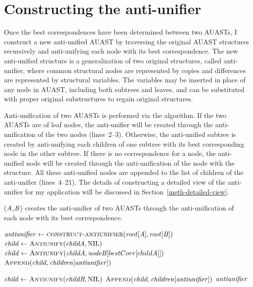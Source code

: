 \section{Constructing the anti-unifier} \label{meth-antiUnifier}
Once the best correspondences have been determined between two AUASTs, I construct a new anti-unified AUAST by traversing the original AUAST structures recursively and anti-unifying each node with its best correspondence. The new anti-unified structure is a generalization of two original structures, called anti-unifier, where common structural nodes are represented by copies and differences are represented by structural variables. The variables may be inserted in place of any node in AUAST, including both subtrees and leaves, and can be substituted with proper original substructures to regain original structures.



Anti-unification of two AUASTs is performed via the  algorithm. If the two AUASTs are of leaf nodes, the anti-unifier will be created through the anti-unification of the two nodes (lines~2--3). Otherwise, the anti-unified subtree is created by anti-unifying each children of one subtree with its best corresponding node in the other subtree. If there is no correspondence for a node, the anti-unified node will be created through the anti-unification of the node with the \NIL{} structure. All these anti-unified nodes are appended to the list of children of the anti-unifier (lines~4--21). The details of constructing a detailed view of the anti-unifier for my application will be discussed in Section~\ref{meth-detailed-view}.


\begin{algorithm}
 \caption{($\mathit{A}$,$\mathit{B}$) creates the anti-unifier of two AUASTs through the anti-unification of each node with its best correspondence.}
  \label{AntiUnify}
  \begin{algorithmic}[1]
\AntiUnify
{}
  \State $\mathit{antiunifier} \gets   \textsc{construct-antiunifier}(\mathit{root}[\mathit{A}],\mathit{root}[\mathit{B}])$
  \State $\mathit{child} \gets   \textsc{Antiunify}(\mathit{childA},\textrm{NIL})$
\Else	
 \State $\mathit{child} \gets   \textsc{Antiunify}(\mathit{childA},\mathit{nodeB}[bestCorr[childA]])$
\EndIf
\State $\textsc{Append}(\mathit{child},\mathit{children[antiunifier]})$
\EndFor
\EndIf

  \State $\mathit{child} \gets   \textsc{Antiunify}(\mathit{childB},\textrm{NIL})$
\EndIf
\State $\textsc{Append}(\mathit{child},\mathit{children[antiunifier]})$
\EndFor
 \EndIf
\Return $\mathit{antiunifier}$
\end{algorithmic}
\end{algorithm}



